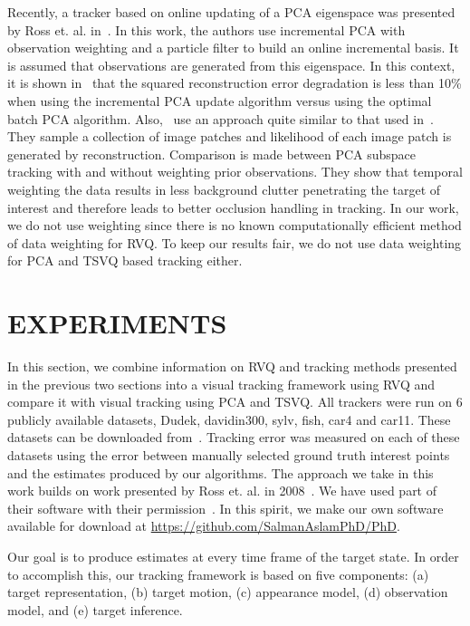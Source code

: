 \documentclass{article}
\begin{document}
Recently, a tracker based on online updating of a PCA eigenspace was presented by Ross et. al. in~\cite{2008_JNL_subspaceTRK_Ross}.  In this work, the authors use incremental PCA with observation weighting and a particle filter to build an online incremental basis.  It is assumed that observations are generated from this eigenspace.  In this context, it is shown in~\cite{2008_JNL_TRKsubs_Skocaj} that the squared reconstruction error degradation is less than 10\% when using the incremental PCA update algorithm versus using the optimal batch PCA algorithm.  Also,~\cite{2010_CNF_TRKsubs_Qian} use an approach quite similar to that used in~\cite{2008_JNL_subspaceTRK_Ross}.  They sample a collection of image patches and likelihood of each image patch is generated by reconstruction.  Comparison is made between PCA subspace tracking with and without weighting prior observations.  They show that temporal weighting the data results in less background clutter penetrating the target of interest and therefore leads to better occlusion handling in tracking.  In our work, we do not use weighting since there is no known computationally efficient method of data weighting for RVQ.  To keep our results fair, we do not use data weighting for PCA and TSVQ based tracking either.  


\section{EXPERIMENTS}
In this section, we combine information on RVQ and tracking methods presented in the previous two sections into a visual tracking framework using RVQ and compare it with visual tracking using PCA and TSVQ.  All trackers were run on 6 publicly available datasets, Dudek, davidin300, sylv, fish, car4 and car11.  These datasets can be downloaded from~\cite{2008_JNL_subspaceTRK_Ross}. Tracking error was measured on each of these datasets using the error between manually selected ground truth interest points and the estimates produced by our algorithms.  The approach we take in this work builds on work presented by Ross et. al. in 2008~\cite{2008_JNL_subspaceTRK_Ross}.  We have used part of their software with their permission~\cite{2008_SFT_Ross}.  In this spirit, we make our own software available for download at \mbox{{\url{https://github.com/SalmanAslamPhD/PhD}}}.  

Our goal is to produce estimates at every time frame of the target state.  In order to accomplish this, our tracking framework is based on five components: (a) target representation, (b) target motion, (c) appearance model, (d) observation model, and (e) target inference.  
\end{document}
